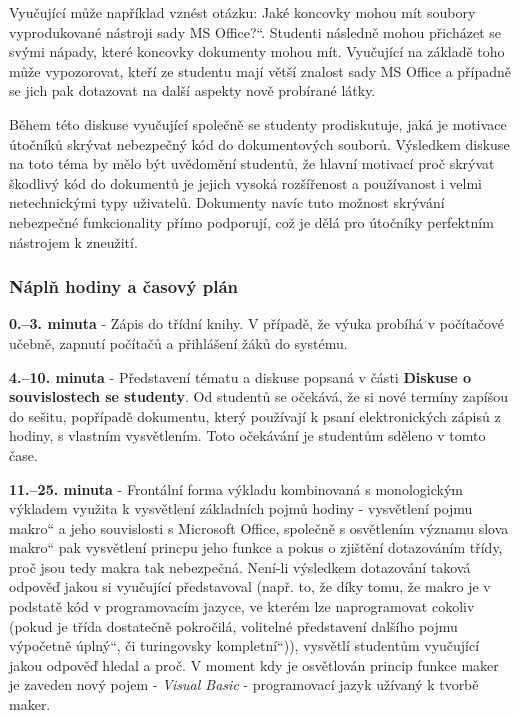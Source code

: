 \documentclass[a4paper, 12pt]{article}
\providecommand{\uv}[1]{\quotedblbase #1\textquotedblleft}
\begin{document}
Vyučující může například vznést otázku: \uv{Jaké koncovky mohou mít soubory vyprodukované nástroji sady MS Office?}. Studenti následně mohou přicházet se svými nápady, které koncovky dokumenty mohou mít. Vyučující na základě toho může vypozorovat, kteří ze studentu mají větší znalost sady MS Office a případně se jich pak dotazovat na další aspekty nově probírané látky. 

Během této diskuse vyučující společně se studenty prodiskutuje, jaká je motivace útočníků skrývat nebezpečný kód do dokumentových souborů. Výsledkem diskuse na toto téma by mělo být uvědomění studentů, že hlavní motivací proč skrývat škodlivý kód do dokumentů je jejich vysoká rozšířenost a používanost i velmi netechnickými typy uživatelů. Dokumenty navíc tuto možnost skrývání nebezpečné funkcionality přímo podporují, což je dělá pro útočníky perfektním nástrojem k zneužití.

\subsubsection{Náplň hodiny a časový plán}
\indent\textbf{0.--3. minuta} - Zápis do třídní knihy. V případě, že výuka probíhá v počítačové učebně, zapnutí počítačů a přihlášení žáků do systému.

\textbf{4.--10. minuta} - Představení tématu a diskuse popsaná v části \textbf{Diskuse o souvislostech se studenty}. Od studentů se očekává, že si nové termíny zapíšou do sešitu, popřípadě dokumentu, který používají k psaní elektronických zápisů z hodiny, s vlastním vysvětlením. Toto očekávání je studentům sděleno v tomto čase.

\textbf{11.--25. minuta} - Frontální forma výkladu kombinovaná s monologickým výkladem využita k vysvětlení základních pojmů hodiny - vysvětlení pojmu \uv{makro} a jeho souvislosti s Microsoft Office, společně s osvětlením významu slova \uv{makro} pak vysvětlení princpu jeho funkce a pokus o zjištění dotazováním třídy, proč jsou tedy makra tak nebezpečná. Není-li výsledkem dotazování taková odpověď jakou si vyučující představoval (např. to, že díky tomu, že makro je v podstatě kód v programovacím jazyce, ve kterém lze naprogramovat cokoliv (pokud je třída dostatečně pokročilá, volitelné představení dalšího pojmu \uv{výpočetně úplný}, či \uv{turingovsky kompletní})), vysvětlí studentům vyučující jakou odpověď hledal a proč. V moment kdy je osvětlován princip funkce maker je zaveden nový pojem - \textit{Visual Basic} - programovací jazyk užívaný k tvorbě maker.
\end{document}
